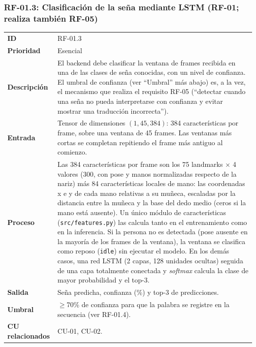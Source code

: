 \subsubsection{RF-01.3: Clasificación de la seña mediante LSTM (RF-01; realiza también RF-05)}
\begin{table}[H]
\centering
\begin{tabularx}{\textwidth}{l X}
\toprule
\textbf{ID} & RF-01.3 \\
\textbf{Prioridad} & Esencial \\
\textbf{Descripción} & El backend debe clasificar la ventana de frames recibida en una de las clases de seña conocidas, con un nivel de confianza. El umbral de confianza (ver ``Umbral'' más abajo) es, a la vez, el mecanismo que realiza el requisito RF-05 (``detectar cuando una seña no pueda interpretarse con confianza y evitar mostrar una traducción incorrecta''). \\
\textbf{Entrada} & Tensor de dimensiones $(1, 45, 384)$: 384 características por frame, sobre una ventana de 45 frames. Las ventanas más cortas se completan repitiendo el frame más antiguo al comienzo. \\
\textbf{Proceso} & Las 384 características por frame son los 75 landmarks $\times$ 4 valores (300, con pose y manos normalizadas respecto de la nariz) más 84 características locales de mano: las coordenadas x e y de cada mano relativas a su muñeca, escaladas por la distancia entre la muñeca y la base del dedo medio (ceros si la mano está ausente). Un único módulo de características (\texttt{src/features.py}) las calcula tanto en el entrenamiento como en la inferencia. Si la persona no es detectada (pose ausente en la mayoría de los frames de la ventana), la ventana se clasifica como reposo (\texttt{idle}) sin ejecutar el modelo. En los demás casos, una red LSTM (2 capas, 128 unidades ocultas) seguida de una capa totalmente conectada y \textit{softmax} calcula la clase de mayor probabilidad y el top-3. \\
\textbf{Salida} & Seña predicha, confianza (\%) y top-3 de predicciones. \\
\textbf{Umbral} & $\geq$70\% de confianza para que la palabra se registre en la secuencia (ver RF-01.4). \\
\textbf{CU relacionados} & CU-01, CU-02. \\
\bottomrule
\end{tabularx}
\end{table}

